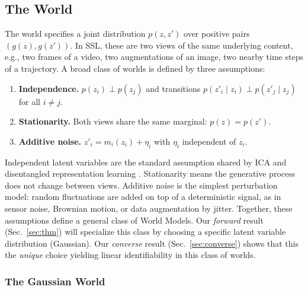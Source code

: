 \documentclass{article}
\begin{document}
\subsection{The World}\label{sec:world-model}
The world specifies a joint distribution $p(z, z')$ over positive pairs $(g(z), g(z'))$.
In SSL, these are two views of the same underlying content, e.g., two frames of a video, two augmentations of an image, two nearby time steps of a trajectory. A broad class of worlds is defined by three assumptions:

\begin{assumptionbox}[World]\label{assumptions}
\begin{enumerate}[label=(\roman*), leftmargin=32pt, itemsep=2pt]
    \item \textbf{Independence.}
    $p(z_i) \perp p(z_j)$ and transitions $p(z'_i \mid z_i) \perp p(z'_j \mid z_j)$ for all $i \neq j$.

    \item \textbf{Stationarity.}
    Both views share the same marginal: $p(z) = p(z')$.

    \item \textbf{Additive noise.} $z'_i = m_i(z_i) + \eta_i$ with $\eta_i$ independent of $z_i$.
\end{enumerate}
\end{assumptionbox}

Independent latent variables are the standard assumption shared by ICA and disentangled representation learning \citep{hyvarinen2024identifiability, bengio2013representation}.
Stationarity means the generative process does not change between views.
Additive noise is the simplest perturbation model: random fluctuations are added on top of a deterministic signal, as in sensor noise, Brownian motion, or data augmentation by jitter.
Together, these assumptions define a general class of World Models.
Our \textit{forward} result (Sec.~\ref{sec:thm}) will specialize this class by choosing a specific latent variable distribution (Gaussian).
Our \textit{converse} result (Sec.~\ref{sec:converse}) shows that this the \textit{unique} choice yielding linear identifiability in this class of worlds.


\subsubsection{The Gaussian World}\label{sec:gaussian-wm}
\end{document}
